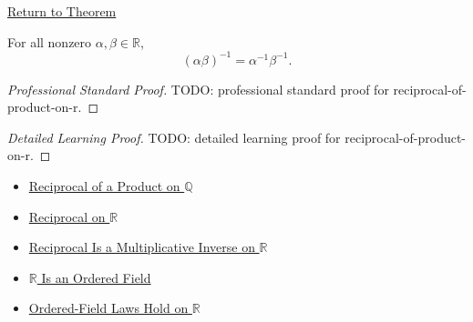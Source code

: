 \newpage
{}
\label{prf:reciprocal-of-product-on-r}

\begin{remark*}[Return]
\hyperref[thm:reciprocal-of-product-on-r]{Return to Theorem}
\end{remark*}

\begin{theorem*}
For all nonzero $\alpha,\beta\in\mathbb{R}$,
\[
(\alpha\beta)^{-1}=\alpha^{-1}\beta^{-1}.
\]
\end{theorem*}

\begin{proof}[Professional Standard Proof]
\LRAProofBodyStart
TODO: professional standard proof for reciprocal-of-product-on-r.
\end{proof}

\begin{proof}[Detailed Learning Proof]
\LRAProofBodyStart
TODO: detailed learning proof for reciprocal-of-product-on-r.
\end{proof}

\begin{remark*}
\end{remark*}

\begin{dependencies}
\begin{itemize}
  \item \hyperref[thm:reciprocal-of-product-on-q]{Reciprocal of a Product on $\mathbb{Q}$}
  \item \hyperref[def:reciprocal-on-r]{Reciprocal on $\mathbb{R}$}
  \item \hyperref[thm:reciprocal-multiplicative-inverse-on-r]{Reciprocal Is a Multiplicative Inverse on $\mathbb{R}$}
  \item \hyperref[thm:r-is-an-ordered-field]{$\mathbb{R}$ Is an Ordered Field}
  \item \hyperref[cor:ordered-field-laws-on-r]{Ordered-Field Laws Hold on $\mathbb{R}$}
\end{itemize}
\end{dependencies}

\clearpage
